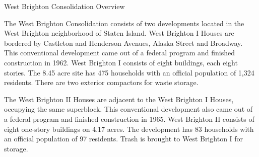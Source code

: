 West Brighton Consolidation Overview

The West Brighton Consolidation consists of two developments located in the West Brighton neighborhood of Staten Island. West Brighton I Houses are bordered by Castleton and Henderson Avenues, Alaska Street and Broadway. This conventional development came out of a federal program and finished construction in 1962. West Brighton I consists of eight buildings, each eight stories. The 8.45 acre site has 475 households with an official population of 1,324 residents. There are two exterior compactors for waste storage.

The West Brighton II Houses are adjacent to the West Brighton I Houses, occupying the same superblock. This conventional development also came out of a federal program and finished construction in 1965. West Brighton II consists of eight one-story buildings on 4.17 acres. The development has 83 households with an official population of 97 residents. Trash is brought to West Brighton I for storage.